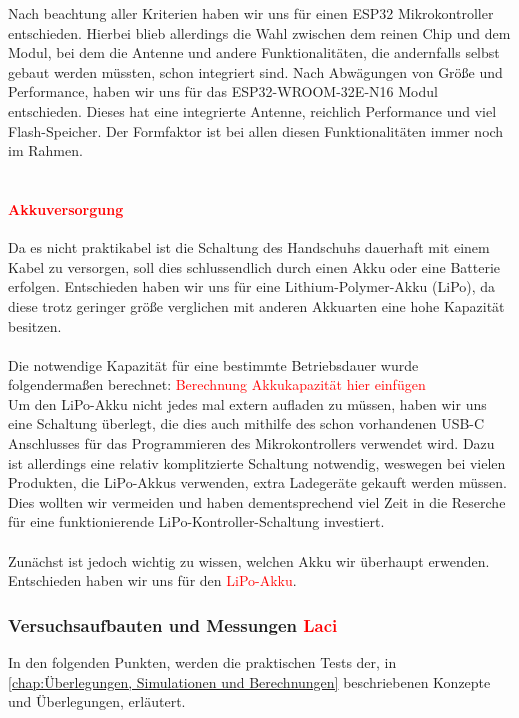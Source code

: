 \documentclass[titlepage,12pt,twoside]{article}
\begin{document}
Nach beachtung aller Kriterien haben wir uns für einen ESP32 Mikrokontroller entschieden. Hierbei blieb allerdings die Wahl zwischen
dem reinen Chip und dem Modul, bei dem die Antenne und andere Funktionalitäten, die andernfalls selbst gebaut werden müssten,
schon integriert sind. Nach Abwägungen von Größe und Performance, haben wir uns für das ESP32-WROOM-32E-N16 Modul entschieden.
Dieses hat eine integrierte Antenne, reichlich Performance und viel Flash-Speicher. Der Formfaktor ist bei allen diesen 
Funktionalitäten immer noch im Rahmen. \\
\\
\paragraph{\textcolor{red}{Akkuversorgung}}
\hfill \break
\hfill \break
Da es nicht praktikabel ist die Schaltung des Handschuhs dauerhaft mit einem Kabel zu versorgen, soll dies schlussendlich durch
einen Akku oder eine Batterie erfolgen. Entschieden haben wir uns für eine Lithium-Polymer-Akku (LiPo), da diese trotz geringer 
größe verglichen mit anderen Akkuarten eine hohe Kapazität besitzen. \\
\\
Die notwendige Kapazität für eine bestimmte Betriebsdauer wurde folgendermaßen berechnet:
\textcolor{red}{Berechnung Akkukapazität hier einfügen}
\\
Um den LiPo-Akku nicht jedes mal extern aufladen zu müssen, haben wir uns eine Schaltung überlegt, die dies auch mithilfe des
schon vorhandenen USB-C Anschlusses für das Programmieren des Mikrokontrollers verwendet wird. Dazu ist allerdings eine relativ 
komplitzierte Schaltung notwendig, weswegen bei vielen Produkten, die LiPo-Akkus verwenden, extra Ladegeräte gekauft werden müssen.
Dies wollten wir vermeiden und haben dementsprechend viel Zeit in die Reserche für eine funktionierende LiPo-Kontroller-Schaltung
investiert. \\
\\
Zunächst ist jedoch wichtig zu wissen, welchen Akku wir überhaupt erwenden. Entschieden haben wir uns für den \textcolor{red}{LiPo-Akku}.
\\

\subsubsection{Versuchsaufbauten und Messungen \textcolor{red}{Laci}}
In den folgenden Punkten, werden die praktischen Tests der, in \autoref{chap:Überlegungen, Simulationen und Berechnungen} beschriebenen Konzepte und Überlegungen, erläutert.\\
\end{document}
